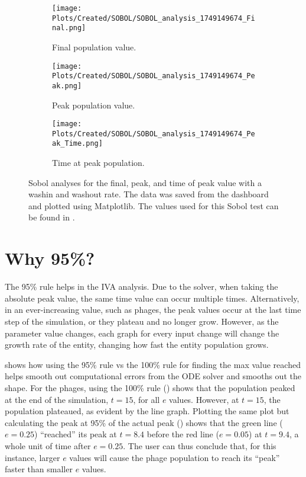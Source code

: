 \begin{figure}[ht!]
    \centering
    \begin{subfigure}{0.32\linewidth}
        \centering
        \captionsetup{width=1\linewidth}
        \texttt{[image: Plots/Created/SOBOL/SOBOL\_analysis\_1749149674\_Final.png]}
        \caption{
            Final population value. 
        }
        \label{fig:created:Sobol_final}
    \end{subfigure}
    \hfill
    \begin{subfigure}{0.32\linewidth}
        \centering
        \captionsetup{width=1\linewidth}
        \texttt{[image: Plots/Created/SOBOL/SOBOL\_analysis\_1749149674\_Peak.png]}
        \caption{
            Peak population value. 
        }
        \label{fig:created:Sobol_peak}
    \end{subfigure}
    \hfill
    \begin{subfigure}{0.32\linewidth}
        \centering
        \captionsetup{width=1\linewidth}
        \texttt{[image: Plots/Created/SOBOL/SOBOL\_analysis\_1749149674\_Peak\_Time.png]}
        \caption{
            Time at peak population. 
        }
        \label{fig:created:Sobol_peak_time}
    \end{subfigure}
    \caption{
            Sobol analyses for the final, peak, and time of peak value with a washin and washout rate. 
            The data was saved from the dashboard and plotted using Matplotlib. 
            The values used for this Sobol test can be found in . 
        }
    \label{fig:created:Sobol_analyses}
\end{figure}

\section{Why 95\%?}
\label{sec:appendixF:why_95}
The 95\% rule helps in the IVA analysis. 
Due to the solver, when taking the absolute peak value, the same time value can occur multiple times. 
Alternatively, in an ever-increasing value, such as phages, the peak values occur at the last time step of the simulation, or they plateau and no longer grow. 
However, as the parameter value changes, each graph for every input change will change the growth rate of the entity, changing how fast the entity population grows. 

 shows how using the 95\% rule vs the 100\% rule for finding the max value reached helps smooth out computational errors from the ODE solver and smooths out the shape. 
For the phages, using the 100\% rule () shows that the population peaked at the end of the simulation, $t=15$, for all $e$ values. 
However, at $t=15$, the population plateaued, as evident by the line graph. 
Plotting the same plot but calculating the peak at 95\% of the actual peak () shows that the green line ($e=0.25$) “reached” its peak at $t=8.4$ before the red line ($e=0.05$) at $t=9.4$, a whole unit of time after $e=0.25$. 
The user can thus conclude that, for this instance, larger $e$ values will cause the phage population to reach its “peak” faster than smaller $e$ values. 

